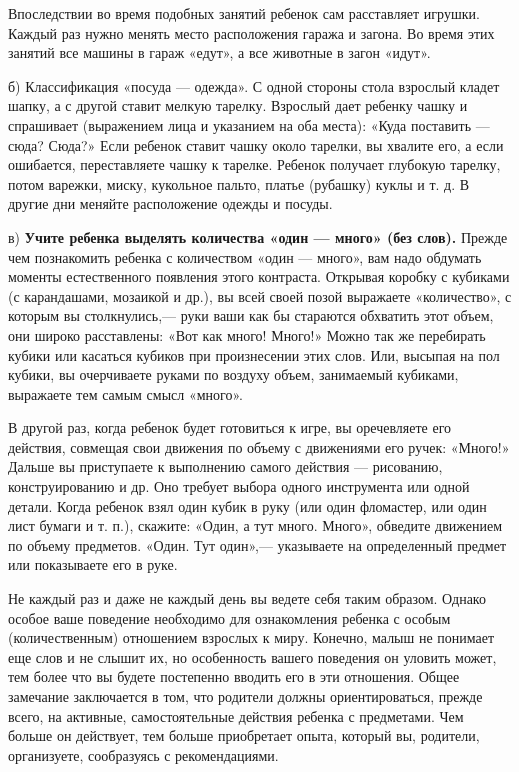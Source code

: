 \documentclass{book}
\begin{document}
Впоследствии во время подобных занятий ребенок сам расставляет игрушки.
Каждый раз нужно менять место расположения гаража и загона. Во время
этих занятий все машины в гараж «едут», а все животные в загон «идут».

б) Классификация «посуда --- одежда». С одной стороны стола взрослый
кладет шапку, а с другой ставит мелкую тарелку. Взрослый дает ребенку
чашку и спрашивает (выражением лица и указанием на оба места): «Куда
поставить --- сюда? Сюда?» Если ребенок ставит чашку около тарелки, вы
хвалите его, а если ошибается, переставляете чашку к тарелке. Ребенок
получает глубокую тарелку, потом варежки, миску, кукольное пальто,
платье (рубашку) куклы и т. д. В другие дни меняйте расположение одежды
и посуды.

в) \textbf{Учите ребенка выделять количества «один --- много» (без
слов).} Прежде чем познакомить ребенка с количеством «один --- много»,
вам надо обдумать моменты естественного появления этого контраста.
Открывая коробку с кубиками (с карандашами, мозаикой и др.), вы всей
своей позой выражаете «количество», с которым вы столкнулись,--- руки
ваши как бы стараются обхватить этот объем, они широко расставлены: «Вот
как много! Много!» Можно так же перебирать кубики или касаться кубиков
при произнесении этих слов. Или, высыпая на пол кубики, вы очерчиваете
руками по воздуху объем, занимаемый кубиками, выражаете тем самым смысл
«много».

В другой раз, когда ребенок будет готовиться к игре, вы оречевляете его
действия, совмещая свои движения по объему с движениями его ручек:
«Много!» Дальше вы приступаете к выполнению самого действия ---
рисованию, конструированию и др. Оно требует выбора одного инструмента
или одной детали. Когда ребенок взял один кубик в руку (или один
фломастер, или один лист бумаги и т. п.), скажите: «Один, а тут много.
Много», обведите движением по объему предметов. «Один. Тут один»,---
указываете на определенный предмет или показываете его в руке.

Не каждый раз и даже не каждый день вы ведете себя таким образом. Однако
особое ваше поведение необходимо для ознакомления ребенка с особым
(количественным) отношением взрослых к миру. Конечно, малыш не понимает
еще слов и не слышит их, но особенность вашего поведения он уловить
может, тем более что вы будете постепенно вводить его в эти отношения.
Общее замечание заключается в том, что родители должны ориентироваться,
прежде всего, на активные, самостоятельные действия ребенка с
предметами. Чем больше он действует, тем больше приобретает опыта,
который вы, родители, организуете, сообразуясь с рекомендациями.
\end{document}
